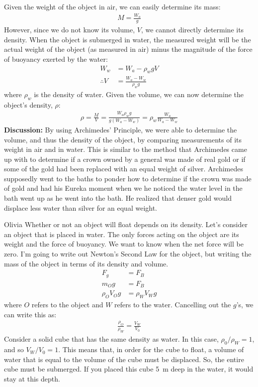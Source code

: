 {{\begin{example}
Given the weight of the object in air, we can easily determine its mass:
\begin{align*}
M = \frac{W_a}{g}
\end{align*}
However, since we do not know its volume, $V$, we cannot directly determine its density. When the object is submerged in water, the measured weight will be the actual weight of the object (as measured in air) minus the magnitude of the force of buoyancy exerted by the water:
\begin{align*}
W_w &= W_a - \rho_w g V\\
\therefore V &= \frac{W_a -W_w}{\rho_w g}
\end{align*}
where $\rho_w$ is the density of water. Given the volume, we can now determine the object's density, $\rho$:
\begin{align*}
\rho = \frac{M}{V}=\frac{W_a\rho_w g}{g (W_a -W_w)}=\rho_w\frac{W_a}{W_a -W_w}
\end{align*}
\textbf{Discussion:} By using Archimedes' Principle, we were able to determine the volume, and thus the density of the object, by comparing measurements of its weight in air and in water. This is similar to the method that Archimedes came up with to determine if a crown owned by a general was made of real gold or if some of the gold had been replaced with an equal weight of silver. Archimedes supposedly went to the baths to ponder how to determine if the crown was made of gold and had his Eureka moment when we he noticed the water level in the bath went up as he went into the bath. He realized that denser gold would displace less water than silver for an equal weight. 
\end{example}
\vspace{-0.65cm}
\begin{studentOpinion}{Olivia}
Whether or not an object will float depends on its density. Let's consider an object that is placed in water. The only forces acting on the object are its weight and the force of buoyancy. We want to know when the net force will be zero. I'm going to write out Newton's Second Law for the object, but writing the mass of the object in terms of its density and volume.
\begin{align*}
F_g&=F_B\\
m_Og&=F_B\\
\rho_OV_Og&=\rho_WV_Wg
\end{align*}
where $O$ refers to the object and $W$ refers to the water. Cancelling out the $g$'s, we can write this as:
\begin{align*}
\frac{\rho_O}{\rho_W}=\frac{V_W}{V_0}
\end{align*}
Consider a solid cube that has the same density as water. In this case, $\rho_0/\rho_W=1$, and so $V_W/V_0=1$. This means that, in order for the cube to float, a volume of water that is equal to the volume of the cube must be displaced. So, the entire cube must be submerged. If you placed this cube \SI{5}{m} deep in the water, it would stay at this depth.


\end{studentOpinion}}}
